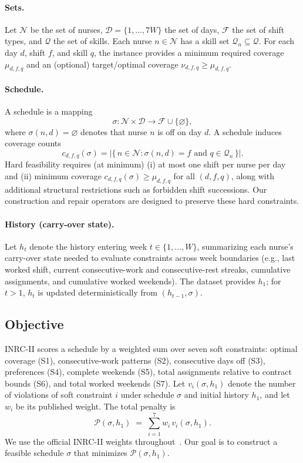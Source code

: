 \documentclass{article}
\begin{document}
\paragraph{Sets.}
Let $\mathcal{N}$ be the set of nurses, $\mathcal{D}=\{1,\ldots,7W\}$ the
set of days, $\mathcal{F}$ the set of shift types, and $\mathcal{Q}$ the
set of skills. Each nurse $n\in\mathcal{N}$ has a skill set
$\mathcal{Q}_n \subseteq \mathcal{Q}$. For each day $d$, shift $f$, and
skill $q$, the instance provides a minimum required coverage
$\mu_{d,f,q}$ and an (optional) target/optimal coverage
$\nu_{d,f,q} \ge \mu_{d,f,q}$.

\paragraph{Schedule.}
A schedule is a mapping
\[
\sigma : \mathcal{N}\times\mathcal{D} \to \mathcal{F}\cup\{\varnothing\},
\]
where $\sigma(n,d)=\varnothing$ denotes that nurse $n$ is off on day $d$.
A schedule induces coverage counts
\[
c_{d,f,q}(\sigma)
= \bigl|\{\, n\in\mathcal{N} : \sigma(n,d)=f \text{ and } q\in\mathcal{Q}_n \,\}\bigr|.
\]
Hard feasibility requires (at minimum) (i) at most one shift per nurse per
day and (ii) minimum coverage $c_{d,f,q}(\sigma)\ge \mu_{d,f,q}$ for all
$(d,f,q)$, along with additional structural restrictions such as forbidden
shift successions. Our construction and repair operators are designed to
preserve these hard constraints.

\paragraph{History (carry-over state).}
Let $h_t$ denote the history entering week $t\in\{1,\ldots,W\}$,
summarizing each nurse's carry-over state needed to evaluate constraints
across week boundaries (e.g., last worked shift, current consecutive-work
and consecutive-rest streaks, cumulative assignments, and cumulative
worked weekends). The dataset provides $h_1$; for $t>1$, $h_t$ is updated
deterministically from $(h_{t-1},\sigma)$.

\subsection{Objective}

INRC-II scores a schedule by a weighted sum over seven soft constraints:
optimal coverage (S1), consecutive-work patterns (S2), consecutive days off
(S3), preferences (S4), complete weekends (S5), total assignments relative
to contract bounds (S6), and total worked weekends (S7). Let
$v_i(\sigma,h_1)$ denote the number of violations of soft constraint $i$
under schedule $\sigma$ and initial history $h_1$, and let $w_i$ be its
published weight. The total penalty is
\[
\mathcal{P}(\sigma,h_1) \;=\; \sum_{i=1}^{7} w_i\, v_i(\sigma,h_1).
\]
We use the official INRC-II weights throughout~\citep{ceschia2019inrc2}.
Our goal is to construct a feasible schedule $\sigma$ that minimizes
$\mathcal{P}(\sigma,h_1)$.
\end{document}
